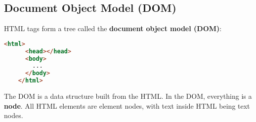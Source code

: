 \subsection{Document Object Model (DOM)}
HTML tags form a tree called the \textbf{document object model (DOM)}: 

\begin{lstlisting}[language=html]
	<html>
	  <head></head>
	  <body>
	    ...
	  </body>
	</html>
\end{lstlisting}

The DOM is a data structure built from the HTML. In the DOM, everything is a \textbf{node}. All HTML elements are element nodes, with text inside HTML being text nodes.

